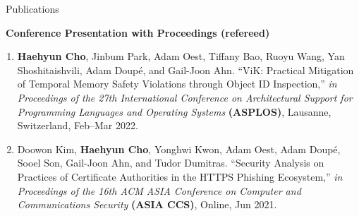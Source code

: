 \documentclass{resume} %
\begin{document}
\begin{rSection}{\faGenderless~Publications}

    \strut\textbullet~{\bf Conference Presentation with Proceedings (refereed)}
    \begin{enumerate}[leftmargin=0pt]



		\item \textbf{Haehyun Cho}, Jinbum Park, Adam Oest, Tiffany Bao, Ruoyu Wang, Yan Shoshitaishvili, Adam Doup\'e, and Gail-Joon Ahn.
		``ViK: Practical Mitigation of Temporal Memory Safety Violations through Object ID Inspection,'' 
		\emph{in Proceedings of the 27th International Conference on Architectural Support for Programming Languages and Operating Systems} \textbf{(ASPLOS)},
		Lausanne, Switzerland, Feb--Mar 2022.

    	\item Doowon Kim, \textbf{Haehyun Cho}, Yonghwi Kwon, Adam Oest, Adam Doup\'e, Sooel Son, Gail-Joon Ahn, and Tudor Dumitras.
    	``Security Analysis on Practices of Certificate Authorities in the HTTPS Phishing Ecosystem,''
    	\emph{in Proceedings of the 16th ACM ASIA Conference on Computer and Communications Security} \textbf{(ASIA CCS)},
    	Online, Jun 2021.


\end{enumerate}
\end{rSection}
\end{document}
